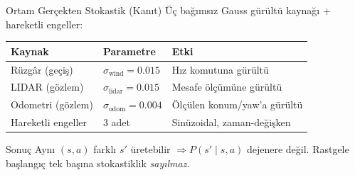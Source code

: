 \documentclass[aspectratio=169,11pt]{beamer}
\begin{document}
\begin{frame}{Ortam Gerçekten Stokastik (Kanıt)}
  Üç bağımsız Gauss gürültü kaynağı + hareketli engeller:
  \vfill
  \begin{center}
  \begin{tabular}{lll}
    \toprule
    \textbf{Kaynak} & \textbf{Parametre} & \textbf{Etki} \\
    \midrule
    Rüzgâr (geçiş) & $\sigma_{\text{wind}}=0.015$ & Hız komutuna gürültü \\
    LIDAR (gözlem) & $\sigma_{\text{lidar}}=0.015$ & Mesafe ölçümüne gürültü \\
    Odometri (gözlem) & $\sigma_{\text{odom}}=0.004$ & Ölçülen konum/yaw'a gürültü \\
    Hareketli engeller & 3 adet & Sinüzoidal, zaman-değişken \\
    \bottomrule
  \end{tabular}
  \end{center}
  \vfill
  \begin{alertblock}{Sonuç}
    Aynı $(s,a)$ farklı $s'$ üretebilir $\Rightarrow P(s'\mid s,a)$ dejenere
    değil. Rastgele başlangıç tek başına stokastiklik \emph{sayılmaz}.
  \end{alertblock}
\end{frame}

\end{document}

